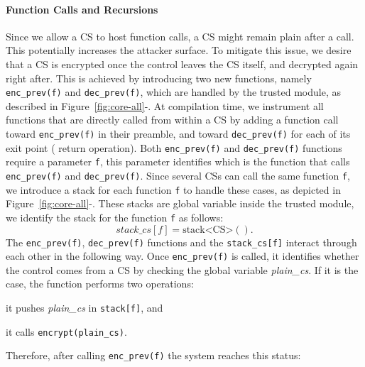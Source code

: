 \paragraph{\textbf{Function Calls and Recursions}}
Since we allow a CS to host function calls, a CS might remain plain after a 
call. This potentially increases the attacker surface.
To mitigate this issue, we desire that a CS is encrypted once the control 
leaves the CS itself, and decrypted again right after.
This is achieved by introducing two new functions, namely \texttt{enc\_prev(f)} 
and \texttt{dec\_prev(f)}, which are handled by the trusted module, as 
described in Figure~\ref{fig:core-all}-.
At compilation time, we instrument all functions that are directly called from 
within a CS by adding a function call toward \texttt{enc\_prev(f)} in their 
preamble, and toward \texttt{dec\_prev(f)} for each of its exit point (\ie 
return operation).
Both \texttt{enc\_prev(f)} and \texttt{dec\_prev(f)} functions require a 
parameter \texttt{f}, this parameter identifies which is the function that 
calls \texttt{enc\_prev(f)} and \texttt{dec\_prev(f)}.
Since several CSs can call the same function \texttt{f}, we introduce a stack 
for each function \texttt{f} to handle these cases, as depicted in 
Figure~\ref{fig:core-all}-.
These stacks are global variable inside the trusted module, we identify the 
stack for the function \texttt{f} as follows:
$$
stack\_cs[f] = \text{stack<CS>}().
$$
The \texttt{enc\_prev(f)}, \texttt{dec\_prev(f)} functions and the 
\texttt{stack\_cs[f]} interact through each other in the following way.
Once \texttt{enc\_prev(f)} is called, it identifies whether the control comes 
from a CS by checking the global variable \emph{plain\_cs}.
If it is the case, the function performs two operations: 
\begin{enumerate*}[label=(\roman*)]
	\item it pushes \emph{plain\_cs} in \texttt{stack[f]}, and
	\item it calls \texttt{encrypt(plain\_cs)}.
\end{enumerate*}
Therefore, after calling \texttt{enc\_prev(f)} the system reaches this status:
